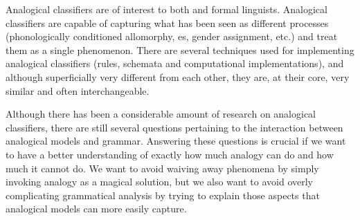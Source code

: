 Analogical classifiers are of interest to both  and formal linguists. Analogical classifiers are capable of capturing what has been seen as different processes (phonologically conditioned allomorphy, es, gender assignment, etc.) and treat them as a single phenomenon. There are several techniques used for implementing analogical classifiers (rules, schemata and computational implementations), and although superficially very different from each other, they are, at their core, very similar and often interchangeable.

Although there has been a considerable amount of research on analogical classifiers, there are still several questions pertaining to the interaction between analogical models and grammar. Answering these questions is crucial if we want to have a better understanding of exactly how much analogy can do and how much it cannot do. We want to avoid waiving away phenomena by simply invoking analogy as a magical solution, but we also want to avoid overly complicating grammatical analysis by trying to explain those aspects that analogical models can more easily capture.

